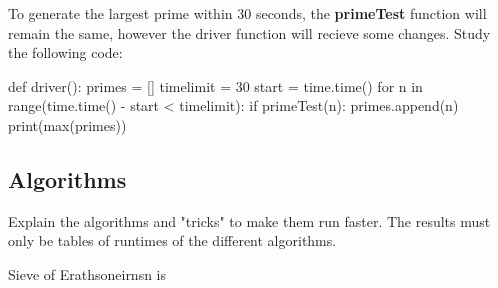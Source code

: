 \documentclass[main.tex]{subfiles}
\begin{document}
To generate the largest prime within 30 seconds, the \textbf{primeTest} function will remain the same, however the driver function will recieve some changes. Study the following code:

\begin{python}
    def driver():
        primes = []
        timelimit = 30
        start = time.time()
        for n in range(time.time() - start < timelimit):
            if primeTest(n):
                primes.append(n)
        print(max(primes))
\end{python}

\subsection{Algorithms}
Explain the algorithms and "tricks" to make them run faster. The results must only be tables of runtimes of the different algorithms.

Sieve of Erathsoneirnsn is 
\end{document}

